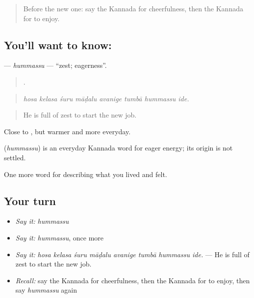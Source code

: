 \label{lesson:KA-C492-hummassu}



\begin{quote}
Before the new one: say the Kannada for cheerfulness, then the Kannada for to enjoy.
\end{quote}

\subsection*{You'll want to know: }
\textbf{} — \emph{hummassu} — \textquotedblleft{}zest; eagerness\textquotedblright{}.

\begin{quote}
       .
\end{quote}

\begin{quote}
\emph{hosa kelasa śuru māḍalu avanige tumbā hummassu ide.}
\end{quote}

\begin{quote}
He is full of zest to start the new job.
\end{quote}

Close to , but warmer and more everyday.

\begin{cousinweb}
\textbf{} (\emph{hummassu}) is an everyday Kannada word for eager energy; its origin is not settled.
\end{cousinweb}

\begin{grammarlens}[title={What you've built}]
One more word for describing what you lived and felt.
\end{grammarlens}

\subsection*{Your turn}
\begin{itemize}
\raggedright
  \item \emph{Say it:} \emph{hummassu}
  \item \emph{Say it:} \emph{hummassu}, once more
  \item \emph{Say it:} \emph{hosa kelasa śuru māḍalu avanige tumbā hummassu ide.} — He is full of zest to start the new job.
  \item \emph{Recall:} say the Kannada for cheerfulness, then the Kannada for to enjoy, then say \emph{hummassu} again
\end{itemize}

